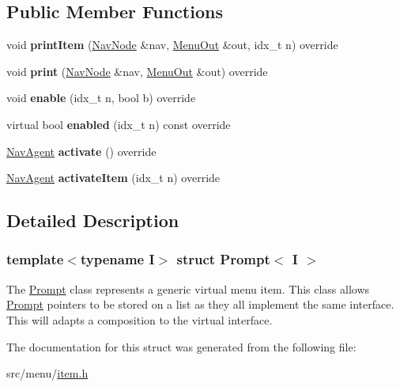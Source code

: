 \subsection*{Public Member Functions}
\begin{DoxyCompactItemize}
\item 
\mbox{\label{structPrompt_ad8624b0a82f850df31fe99362978cb85}} 
void {\bfseries print\+Item} (\hyperlink{structNavNode}{Nav\+Node} \&nav, \hyperlink{structMenuOut}{Menu\+Out} \&out, idx\+\_\+t n) override
\item 
\mbox{\label{structPrompt_a75c7b87e4cd6c54625c571469d48021f}} 
void {\bfseries print} (\hyperlink{structNavNode}{Nav\+Node} \&nav, \hyperlink{structMenuOut}{Menu\+Out} \&out) override
\item 
\mbox{\label{structPrompt_a64dcc2b5814ba7220cf8470596300665}} 
void {\bfseries enable} (idx\+\_\+t n, bool b) override
\item 
\mbox{\label{structPrompt_ab129ad3f038faa401a3a33d6311a639b}} 
virtual bool {\bfseries enabled} (idx\+\_\+t n) const override
\item 
\mbox{\label{structPrompt_adf56bea32063d10f18114b7d717a6385}} 
\hyperlink{structNavAgent}{Nav\+Agent} {\bfseries activate} () override
\item 
\mbox{\label{structPrompt_aaf901b9f2e36d0de2ca00fdb0f183d9b}} 
\hyperlink{structNavAgent}{Nav\+Agent} {\bfseries activate\+Item} (idx\+\_\+t n) override
\end{DoxyCompactItemize}


\subsection{Detailed Description}
\subsubsection*{template$<$typename I$>$\newline
struct Prompt$<$ I $>$}

The \hyperlink{structPrompt}{Prompt} class represents a generic virtual menu item. This class allows \hyperlink{structPrompt}{Prompt} pointers to be stored on a list as they all implement the same interface. This will adapts a composition to the virtual interface. 

The documentation for this struct was generated from the following file\+:\begin{DoxyCompactItemize}
\item 
src/menu/\hyperlink{item_8h}{item.\+h}\end{DoxyCompactItemize}
